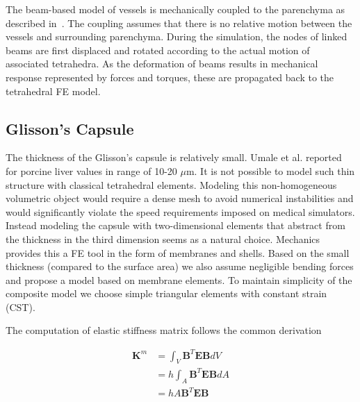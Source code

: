 \documentclass{llncs}
\newcommand{\Mat}[1]{\mathbf{#1}}
\begin{document}
The beam-based model of vessels is mechanically coupled to the parenchyma as described in~\cite{Peterlik2012}. 
The coupling assumes that there is no relative motion between the vessels and surrounding parenchyma. 
During the simulation, the nodes of linked beams are first displaced and rotated according to the actual motion of associated tetrahedra. 
As the deformation of beams results in mechanical response represented by forces and torques, these are propagated back to 
the tetrahedral FE model. 



\subsection{Glisson's Capsule} %

The thickness of the Glisson's capsule is relatively small. Umale et al.
\cite{Umale2011} reported for porcine liver values in range of 10-20
$\mu$m.
It is not possible to model such thin structure with classical tetrahedral
elements. Modeling this non-homogeneous volumetric object would require a
dense mesh to avoid numerical instabilities and would significantly
violate the speed requirements imposed on medical simulators.
Instead modeling the capsule with two-dimensional elements that abstract from the
thickness in the third dimension seems
as a natural choice. Mechanics provides this a FE tool in the form of membranes
and shells. Based on the small thickness (compared to the surface area) we also
assume negligible bending forces and propose a model based on membrane
elements. 
To maintain simplicity of the composite model we choose simple triangular
elements with constant strain (CST).

The computation of elastic stiffness matrix follows the common derivation

\begin{eqnarray}
  \Mat{K}^m & = \int_V \Mat{B}^T \Mat{E} \Mat{B} dV     \label{mem1} \\
            & = h \int_A \Mat{B}^T \Mat{E} \Mat{B} dA   \label{mem2} \\
            & = h A \Mat{B}^T \Mat{E} \Mat{B}           \label{mem3}
\end{eqnarray}
\end{document}
